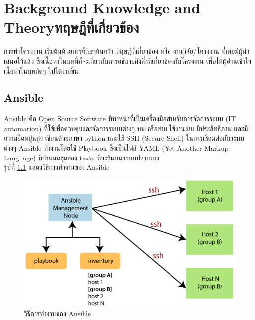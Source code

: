\newcommand{\exinventory}{
  mail.example.com\\

  [webservers] \\
  foo.example.com \\
  bar.example.com \\
  
  [dbservers] \\
  one.example.com \\
  two.example.com \\
  three.example.com}

\chapter{\ifenglish Background Knowledge and Theory\else ทฤษฎีที่เกี่ยวข้อง\fi}

การทำโครงงาน เริ่มต้นด้วยการศึกษาค้นคว้า ทฤษฎีที่เกี่ยวข้อง หรือ งานวิจัย/โครงงาน ที่เคยมีผู้นำเสนอไว้แล้ว ซึ่งเนื้อหาในบทนี้ก็จะเกี่ยวกับการอธิบายถึงสิ่งที่เกี่ยวข้องกับโครงงาน เพื่อให้ผู้อ่านเข้าใจเนื้อหาในบทถัดๆ ไปได้ง่ายขึ้น

\section{Ansible}
\hspace{0.5in} Ansible คือ Open Source Software ที่ทำหน้าที่เป็นเครื่องมือสำหรับการจัดการระบบ (IT automation) ที่ใช้เพื่อควบคุมและจัดการระบบต่างๆ บนเครือข่าย ใช้งานง่าย มีประสิทธิภาพ และมีความยืดหยุ่นสูง เขียนด้วยภาษา python และใช้ SSH (Secure Shell) ในการเชื่อมต่อกับระบบต่างๆ Ansible ทำงานโดยใช้ Playbook ซึ่งเป็นไฟล์ YAML (Yet Another Markup Language) ที่กำหนดชุดของ tasks ที่จะรันบนระบบปลายทาง \\
รูปที่ \ref{fig:ansible_works} แสดงวิธีการทำงานของ Ansible

\begin{figure}
  \begin{center}
    \includegraphics[scale=0.55]{ansible-works.png}
  \end{center}
  \caption[Poem]{วิธีการทำงานของ Ansible}
  \label{fig:ansible_works}
\end{figure}

